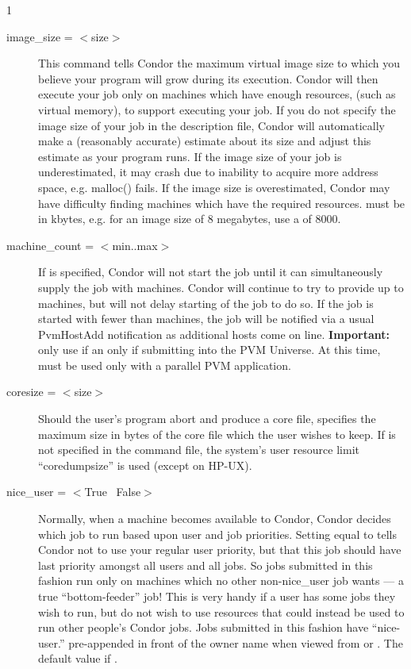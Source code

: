 \begin{ManPage}{\label{man-condor-submit}}{1}
\begin{description}
\item[image\_size = $<$size$>$] This command tells Condor the maximum
virtual image size to which you believe your program will grow during
its execution. Condor will then execute your job only on machines which
have enough resources, (such as virtual memory), to support executing
your job. If you do not specify the image size of your job in the
description file, Condor will automatically make a (reasonably accurate)
estimate about its size and adjust this estimate as your program runs.
If the image size of your job is underestimated, it may crash due to
inability to acquire more address space, e.g. malloc() fails. If the image
size is overestimated, Condor may have difficulty finding machines which
have the required resources.  must be in kbytes, e.g. for
an image size of 8 megabytes, use a  of 8000.


\item[machine\_count = $<$min..max$>$] If  is
specified, Condor will not start the job until it can simultaneously
supply the job with  machines.  Condor will continue to try to provide up
to  machines, but will not delay starting of the job to do so.
If the job is started with fewer than  machines, the job
will be notified via a usual PvmHostAdd notification as additional
hosts come on line.
\textbf{Important:} only use  if an only if
submitting into the PVM Universe.  At this time, 
must be used only with a parallel PVM application.


\item[coresize = $<$size$>$] Should the user's program abort and produce
a core file,  specifies the maximum size in bytes of the
core file which the user wishes to keep. If  is not
specified in the command file, the system's user resource limit
\mbox{``coredumpsize''} is used (except on HP-UX). 


\item[nice\_user = $<$True \Bar\ False$>$] \label{man-condor-submit-nice}Normally, when a machine
becomes available to Condor, Condor decides which job to run based upon
user and job priorities. Setting  equal to 
tells Condor not to use your regular user priority, but that this job
should have last priority amongst all users and all jobs. So jobs
submitted in this fashion run only on machines which no other
non-nice\_user job wants --- a true ``bottom-feeder'' job! This is very
handy if a user has some jobs they wish to run, but do not wish to use
resources that could instead be used to run other people's Condor jobs. Jobs
submitted in this fashion have ``nice-user.'' pre-appended in front of
the owner name when viewed from  or .  The
default value if .


\end{description}
\end{ManPage}
